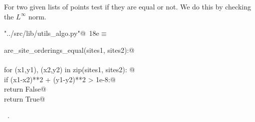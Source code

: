 \documentclass[11.5pt]{report}
\begin{document}
\vspace{-0.8cm}
\newchunk For two given lists of points test if they are 
equal or not. We do this by checking the $L^{\infty}$ norm.
\begin{flushleft} \small
\begin{minipage}{\linewidth}\label{scrap18}\raggedright\small
{} \verb@"../src/lib/utils_algo.py"@\nobreak\ {\footnotesize {18e}}$\equiv$
\vspace{-1ex}
\begin{list}{}{} \item
\mbox{}\verb@def are_site_orderings_equal(sites1, sites2):@\\
\mbox{}\verb@@\\
\mbox{}\verb@    for (x1,y1), (x2,y2) in zip(sites1, sites2): @\\
\mbox{}\verb@        if (x1-x2)**2 + (y1-y2)**2 > 1e-8:@\\
\mbox{}\verb@            return False@\\
\mbox{}\verb@    return True@\\
\mbox{}\verb@@{\NWsep}
\end{list}
\vspace{-1.5ex}
\footnotesize
\begin{list}{}{\setlength{\itemsep}{-\parsep}\setlength{\itemindent}{-\leftmargin}}
\item \NWtxtFileDefBy\ .

\item{}
\end{list}
\end{minipage}\vspace{4ex}
\end{flushleft}
\end{document}
